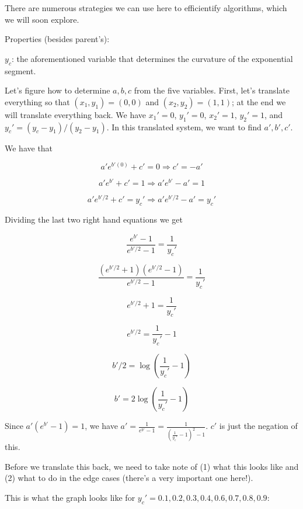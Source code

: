 \documentclass{article}
\begin{document}
{There are numerous strategies we can use here to efficientify algorithms, which we will soon explore.

Properties (besides parent's):

$y_c$: the aforementioned variable that determines the curvature of the exponential segment.

Let's figure how to determine $a,b,c$ from the five variables. First, let's translate everything so that $(x_1,y_1)=(0,0)$ and $(x_2, y_2)=(1,1)$; at the end we will translate everything back. We have $x_1'=0$, $y_1'=0$, $x_2'=1$, $y_2'=1$, and $y_c'=(y_c-y_1)/(y_2-y_1)$. In this translated system, we want to find $a',b',c'$.

We have that

$$a'e^{b'(0)}+c'=0\Longrightarrow c'=-a'$$

$$a'e^{b'}+c'=1\Longrightarrow a'e^{b'}-a'=1$$

$$a'e^{b'/2}+c'=y_c'\Longrightarrow a'e^{b'/2}-a'=y_c'$$

Dividing the last two right hand equations we get

$$\frac{e^{b'}-1}{e^{b'/2}-1}=\frac{1}{y_c'}$$

$$\frac{(e^{b'/2}+1)(e^{b'/2}-1)}{e^{b'/2}-1}=\frac{1}{y_c'}$$

$$e^{b'/2}+1=\frac{1}{y_c'}$$

$$e^{b'/2}=\frac{1}{y_c'}-1$$

$$b'/2 = \log\left(\frac{1}{y_c'}-1\right)$$

$$b' = 2\log\left(\frac{1}{y_c'}-1\right)$$

Since $a'(e^{b'}-1)=1$, we have $a'=\frac{1}{e^{b'}-1}=\frac{1}{\left(\frac{1}{y_c'}-1\right)^2-1}$. $c'$ is just the negation of this.

Before we translate this back, we need to take note of (1) what this looks like and (2) what to do in the edge cases (there's a very important one here!).

This is what the graph looks like for $y_c'=0.1, 0.2, 0.3, 0.4, 0.6, 0.7, 0.8, 0.9$:

}
\end{document}
